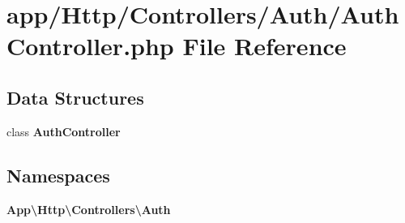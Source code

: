 \section{app/\+Http/\+Controllers/\+Auth/\+Auth\+Controller.php File Reference}
\label{_auth_controller_8php}
\subsection*{Data Structures}
\begin{DoxyCompactItemize}
\item 
class {\bf Auth\+Controller}
\end{DoxyCompactItemize}
\subsection*{Namespaces}
\begin{DoxyCompactItemize}
\item 
 {\bf App\textbackslash{}\+Http\textbackslash{}\+Controllers\textbackslash{}\+Auth}
\end{DoxyCompactItemize}

